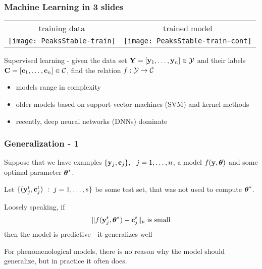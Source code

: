 \documentclass[12pt,fleqn]{beamer}
\begin{document}
\begin{frame}\frametitle{{Machine Learning in 3 slides}}
	
	\begin{center}
		\begin{tabular}{cc}
			training data & trained model\\
			\texttt{[image: PeaksStable-train]}
			&
			\texttt{[image: PeaksStable-train-cont]}
			
		\end{tabular}
	\end{center}
	

Supervised learning - given the data set ${\bf Y} = [{\bf y}_1,\ldots,{\bf y}_n] \in {\cal Y}$
and their labels ${\bf C} = [{\bf c}_1,\ldots,{\bf c}_n] \in {\cal C}$, find the relation $f:{\cal Y}\rightarrow {\cal C}$
 
\bigskip

\begin{itemize}
\item models range in complexity
\item older models based on support vector machines (SVM) and kernel methods
\item recently, deep neural networks (DNNs) dominate
\end{itemize}


\end{frame}

\begin{frame}\frametitle{Generalization - 1}

Suppose that we have examples $\{{\bf y}_j,{\bf c}_j\},\ \ j=1,\ldots,n$,
a model $f({\bf y},{\boldsymbol \theta})$ and some optimal parameter ${\boldsymbol \theta}^*$.

Let $\{({\bf y}^t_j,{\bf c}^t_j) \ : \  j=1,\ldots,s\}$ be some test set, that was not used
to compute ${\boldsymbol \theta}^*$.

\bigskip
\pause

Loosely speaking, if
$$ \|f({\bf y}^t_j,{\boldsymbol \theta}^*) - {\bf c}_j^t\|_p \text{ is small}$$
then the model is predictive - it generalizes well



\pause
\bigskip


For phenomenological models, there is no reason why the model
should generalize, but in practice it often does.


\end{frame}
\end{document}
